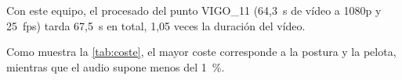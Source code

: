 Con este equipo, el procesado del punto VIGO\_11 (64,3~s de vídeo a 1080p y 25~\ac{fps}) tarda 67,5~s en total, 1,05 veces la duración del vídeo.

\begin{table}[htbp]
  \centering
  \caption{Tiempo de procesado de un punto, por etapa.}
  \label{tab:coste}
  
\end{table}

Como muestra la \cref{tab:coste}, el mayor coste corresponde a la postura y la pelota, mientras que el audio supone menos del 1~\%.
